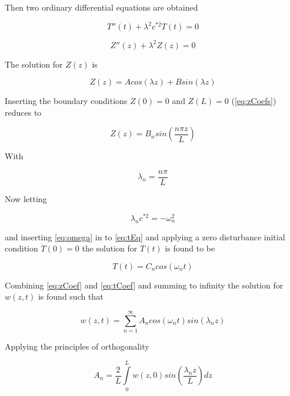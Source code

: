 Then two ordinary differential equations are obtained

\begin{equation}
T''(t) + \lambda^ 2 c^{*2}T(t) = 0
\label{eq:tEq}
\end{equation}

\begin{equation}
Z''(z) + \lambda ^2 Z(z) = 0
\end{equation}

The solution for $Z(z)$ is

\begin{equation}
Z(z) = A cos(\lambda z) + B sin(\lambda z)
\label{eq:zCoefs}
\end{equation}

Inserting the boundary conditions $Z(0) = 0$ and $Z(L) =0$ (\ref{eq:zCoefs}) reduces to

\begin{equation}
Z(z) = B_n sin\left(\frac{n \pi z}{L} \right)
\label{eq:zCoef}
\end{equation} 

With 

\begin{equation}
\lambda _n = \frac{n \pi}{L}
\end{equation}

Now letting

\begin{equation}
\lambda _n c^{*2}  = -\omega _n ^2
\label{eq:omega}
\end{equation}

and inserting \ref{eq:omega} in to \ref{eq:tEq} and applying a zero disturbance initial condition $\dot{T}(0) = 0$ the solution for $T(t)$ is found to be

\begin{equation}
T(t) = C_n cos(\omega _n t)
\label{eq:tCoef}
\end{equation}

Combining \ref{eq:zCoef} and \ref{eq:tCoef} and summing to infinity the solution for $w(z,t)$ is found such that

\begin{equation}
w(z,t) = \sum\limits_{n=1}^{\infty} A_n cos(\omega _n t) sin( \lambda _n z)
\end{equation}

Applying the principles of orthogonality

\begin{equation}
A_n = \frac{2}{L} \int\limits_{0}^{L} w(z, 0) sin\left( \frac{\lambda _n z}{L} \right) dz
\end{equation}


